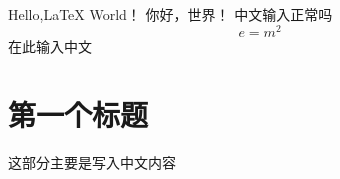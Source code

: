 \documentclass{article}
\begin{document}
    Hello,LaTeX{} World！
    你好，世界！
    中文输入正常吗
    \[
      e=m^2
    \]
    在此输入中文

\section{第一个标题}
这部分主要是写入中文内容
\end{document}
